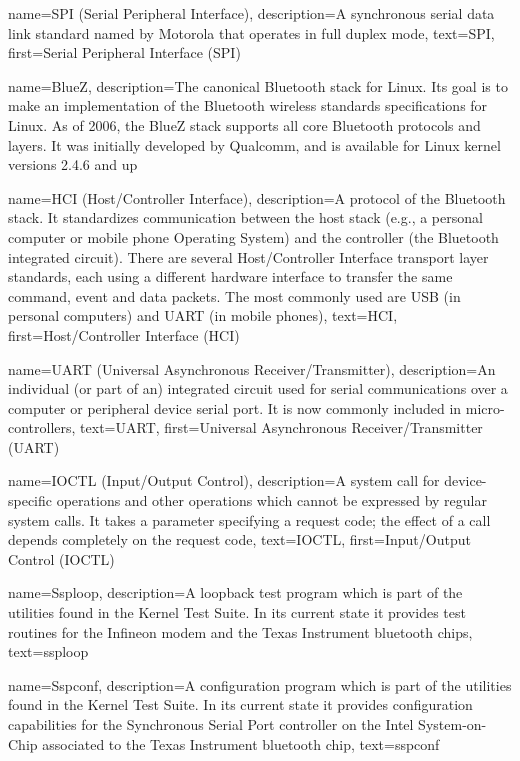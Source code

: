{
  name=SPI (Serial Peripheral Interface),
  description={A synchronous serial data link standard named by
    Motorola that operates in full duplex mode},
  text=SPI,
  first=Serial Peripheral Interface (SPI)
}

{
  name=BlueZ,
  description={The canonical Bluetooth stack for Linux. Its goal is to
    make an implementation of the Bluetooth wireless standards
    specifications for Linux. As of 2006, the BlueZ stack supports all
    core Bluetooth protocols and layers. It was initially developed by
    Qualcomm, and is available for Linux kernel versions 2.4.6 and up}
}

{
  name=HCI (Host/Controller Interface),
  description={A protocol of the Bluetooth stack. It standardizes
    communication between the host stack (e.g., a personal computer or
    mobile phone Operating System) and the controller (the Bluetooth
    integrated circuit). There are several Host/Controller Interface
    transport layer standards, each using a different hardware
    interface to transfer the same command, event and data
    packets. The most commonly used are USB (in personal computers)
    and UART (in mobile phones)},
  text=HCI,
  first=Host/Controller Interface (HCI)
}

{
  name=UART (Universal Asynchronous Receiver/Transmitter),
  description={An individual (or part of an) integrated circuit used
    for serial communications over a computer or peripheral device
    serial port. It is now commonly included in micro-controllers},
  text=UART,
  first=Universal Asynchronous Receiver/Transmitter (UART)
}

{
  name=IOCTL (Input/Output Control),
  description={A system call for device-specific operations and other
    operations which cannot be expressed by regular system calls. It
    takes a parameter specifying a request code; the effect of a call
    depends completely on the request code},
  text=IOCTL,
  first=Input/Output Control (IOCTL)
}

{
  name=Ssploop,
  description={A loopback test program which is part of the utilities
    found in the Kernel Test Suite. In its current state it provides
    test routines for the Infineon modem and the Texas Instrument
    bluetooth chips},
  text=ssploop
}

{
  name=Sspconf,
  description={A configuration program which is part of the utilities
    found in the Kernel Test Suite. In its current state it provides
    configuration capabilities for the Synchronous Serial Port
    controller on the Intel System-on-Chip associated to the Texas
    Instrument bluetooth chip},
  text=sspconf
}

